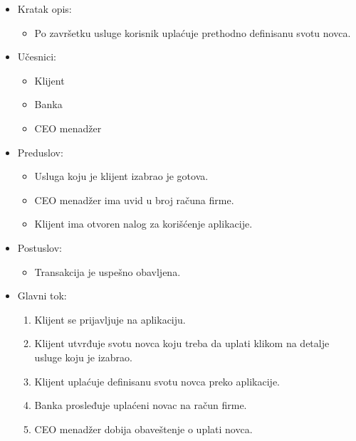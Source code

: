 \documentclass[a4paper]{article}
\begin{document}
\begin{itemize}
    \item Kratak opis: 
    \begin{itemize}
        \item Po završetku usluge korisnik uplaćuje prethodno definisanu svotu novca.
    \end{itemize}
    \item Učesnici:
        \begin{itemize}
        \item Klijent
        \item Banka
        \item CEO menadžer
    \end{itemize}
    \item Preduslov:
        \begin{itemize}
            \item Usluga koju je klijent izabrao je gotova.
            \item CEO menadžer ima uvid u broj računa firme.
            \item Klijent ima otvoren nalog za korišćenje aplikacije.
        \end{itemize}
    \item Postuslov:
        \begin{itemize}
            \item Transakcija je uspešno obavljena.
            \end{itemize}
    \item Glavni tok:
        \begin{enumerate}
            \item Klijent se prijavljuje na aplikaciju.
            \item Klijent utvrđuje svotu novca koju treba da uplati klikom na detalje usluge koju je izabrao.
            \item Klijent uplaćuje definisanu svotu novca preko aplikacije. 
            \item Banka prosleđuje uplaćeni novac na račun firme.
            \item CEO menadžer dobija obaveštenje o uplati novca.
        \end{enumerate}
\end{itemize}
\end{document}
